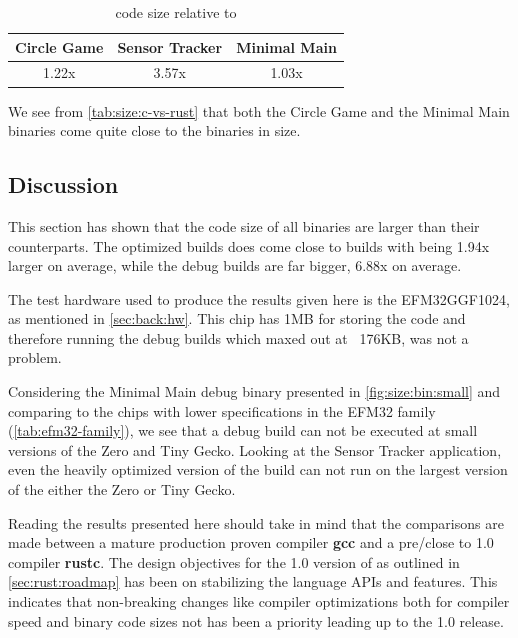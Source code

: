 \begin{table}[H]
  \centering
  \begin{tabular}{|c|c|c|}
    \hline
    Circle Game & Sensor Tracker & Minimal Main \\
    \hline
    1.22x & 3.57x & 1.03x \\
    \hline
  \end{tabular}
  \caption{{\rust} code size relative to {\C}}
  \label{tab:size:c-vs-rust}
\end{table}

We see from \autoref{tab:size:c-vs-rust} that both the Circle Game and the Minimal Main  {\rust} binaries come quite close to the {\C} binaries in size.

\subsection{Discussion}

This section has shown that the code size of all {\rust} binaries are larger than their {\C} counterparts.
The optimized {\rust} builds does come close to {\C} builds with being 1.94x larger on average, while the debug builds are far bigger, 6.88x on average.

The test hardware used to produce the results given here is the EFM32GGF1024, as mentioned in \autoref{sec:back:hw}.
This chip has 1MB for storing the code and therefore running the debug builds which maxed out at ~176KB, was not a problem.

Considering the Minimal Main debug binary presented in \autoref{fig:size:bin:small} and comparing to the chips with lower specifications in the EFM32 family (\autoref{tab:efm32-family}), we see that a debug build can not be executed at small versions of the Zero and Tiny Gecko.
Looking at the Sensor Tracker application, even the heavily optimized version of the {\rust} build can not run on the largest version of the either the Zero or Tiny Gecko.

Reading the results presented here should take in mind that the comparisons are made between a mature production proven compiler \textbf{gcc} and a pre/close to 1.0 compiler \textbf{rustc}.
The design objectives for the 1.0 version of {\rust} as outlined in \autoref{sec:rust:roadmap} has been on stabilizing the language APIs and features.
This indicates that non-breaking changes like compiler optimizations both for compiler speed and binary code sizes not has been a priority leading up to the 1.0 release.
